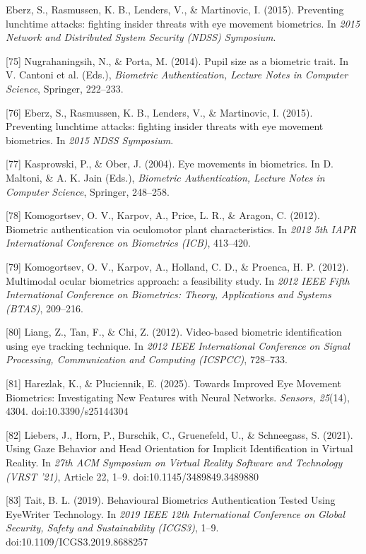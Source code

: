 \documentclass[12pt]{report}
\begin{document}
\begin{raggedright}
[74] Eberz, S., Rasmussen, K. B., Lenders, V., \& Martinovic, I. (2015). Preventing lunchtime attacks: fighting insider threats with eye movement biometrics. In \textit{2015 Network and Distributed System Security (NDSS) Symposium}.

[75] Nugrahaningsih, N., \& Porta, M. (2014). Pupil size as a biometric trait. In V. Cantoni et al. (Eds.), \textit{Biometric Authentication, Lecture Notes in Computer Science}, Springer, 222–233.

[76] Eberz, S., Rasmussen, K. B., Lenders, V., \& Martinovic, I. (2015). Preventing lunchtime attacks: fighting insider threats with eye movement biometrics. In \textit{2015 NDSS Symposium}.

[77] Kasprowski, P., \& Ober, J. (2004). Eye movements in biometrics. In D. Maltoni, \& A. K. Jain (Eds.), \textit{Biometric Authentication, Lecture Notes in Computer Science}, Springer, 248–258.

[78] Komogortsev, O. V., Karpov, A., Price, L. R., \& Aragon, C. (2012). Biometric authentication via oculomotor plant characteristics. In \textit{2012 5th IAPR International Conference on Biometrics (ICB)}, 413–420.

[79] Komogortsev, O. V., Karpov, A., Holland, C. D., \& Proenca, H. P. (2012). Multimodal ocular biometrics approach: a feasibility study. In \textit{2012 IEEE Fifth International Conference on Biometrics: Theory, Applications and Systems (BTAS)}, 209–216.

[80] Liang, Z., Tan, F., \& Chi, Z. (2012). Video-based biometric identification using eye tracking technique. In \textit{2012 IEEE International Conference on Signal Processing, Communication and Computing (ICSPCC)}, 728–733.

[81] Harezlak, K., \& Pluciennik, E. (2025). Towards Improved Eye Movement Biometrics: Investigating New Features with Neural Networks. \textit{Sensors, 25}(14), 4304. doi:10.3390/s25144304

[82] Liebers, J., Horn, P., Burschik, C., Gruenefeld, U., \& Schneegass, S. (2021). Using Gaze Behavior and Head Orientation for Implicit Identification in Virtual Reality. In \textit{27th ACM Symposium on Virtual Reality Software and Technology (VRST '21)}, Article 22, 1–9. doi:10.1145/3489849.3489880

[83] Tait, B. L. (2019). Behavioural Biometrics Authentication Tested Using EyeWriter Technology. In \textit{2019 IEEE 12th International Conference on Global Security, Safety and Sustainability (ICGS3)}, 1–9. doi:10.1109/ICGS3.2019.8688257


\end{raggedright}
\end{document}
